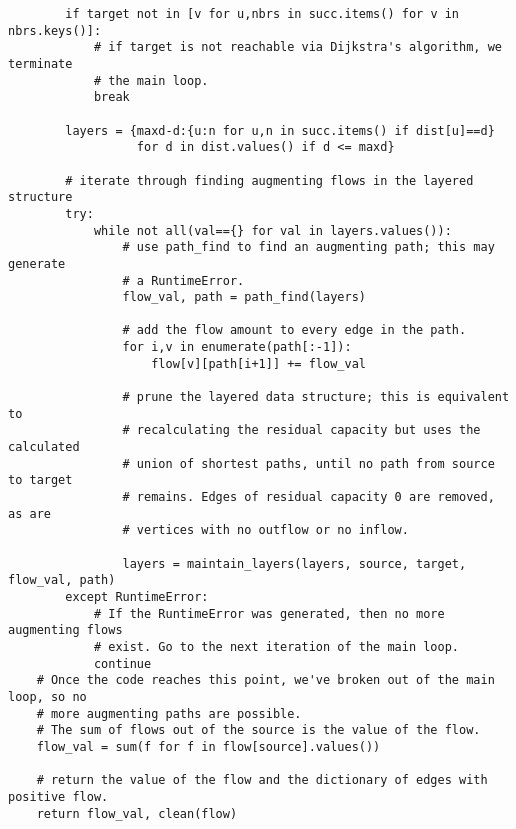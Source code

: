 \documentclass[m3380-lec-main.tex]{subfiles}
\begin{document}
\begin{verbatim}
        if target not in [v for u,nbrs in succ.items() for v in nbrs.keys()]:
            # if target is not reachable via Dijkstra's algorithm, we terminate 
            # the main loop.
            break

        layers = {maxd-d:{u:n for u,n in succ.items() if dist[u]==d} 
                  for d in dist.values() if d <= maxd}

        # iterate through finding augmenting flows in the layered structure
        try:
            while not all(val=={} for val in layers.values()):
                # use path_find to find an augmenting path; this may generate 
                # a RuntimeError.
                flow_val, path = path_find(layers)

                # add the flow amount to every edge in the path.
                for i,v in enumerate(path[:-1]):
                    flow[v][path[i+1]] += flow_val
                    
                # prune the layered data structure; this is equivalent to 
                # recalculating the residual capacity but uses the calculated 
                # union of shortest paths, until no path from source to target 
                # remains. Edges of residual capacity 0 are removed, as are 
                # vertices with no outflow or no inflow.

                layers = maintain_layers(layers, source, target, flow_val, path)
        except RuntimeError:
            # If the RuntimeError was generated, then no more augmenting flows 
            # exist. Go to the next iteration of the main loop.
            continue
    # Once the code reaches this point, we've broken out of the main loop, so no 
    # more augmenting paths are possible.
    # The sum of flows out of the source is the value of the flow.
    flow_val = sum(f for f in flow[source].values())
    
    # return the value of the flow and the dictionary of edges with positive flow.
    return flow_val, clean(flow)
\end{verbatim}
\ec
\end{document}
